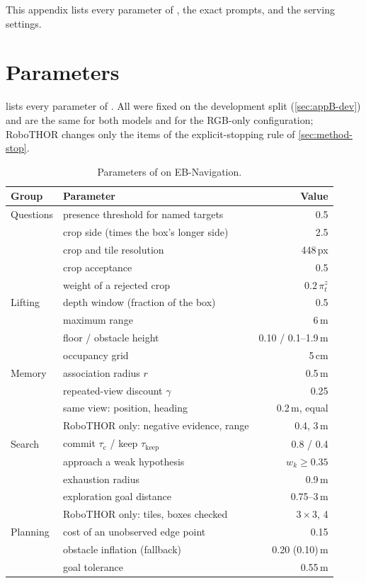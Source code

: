 \label{app:impl}
This appendix lists every parameter of \ours, the exact prompts, and the serving settings.

\section{Parameters}
\label{sec:appA-params}
 lists every parameter of \ours. All were fixed on the development split (\cref{sec:appB-dev})
and are the same for both models and for the RGB-only configuration; RoboTHOR changes only the items of the
explicit-stopping rule of \cref{sec:method-stop}.

\begin{table}[htbp]
\centering\small
\caption{Parameters of \ours on EB-Navigation.}
\label{tab:s-params}
\footnotesize\setlength{\tabcolsep}{3pt}
\begin{tabular*}{\linewidth}{@{\extracolsep{\fill}}llr@{}}
\toprule
Group & Parameter & Value\\
\midrule
Questions & presence threshold for named targets & 0.5\\
 & crop side (times the box's longer side) & 2.5\\
 & crop and tile resolution & 448\,px\\
 & crop acceptance & 0.5\\
 & weight of a rejected crop & $0.2\,\pi^z_t$\\
Lifting & depth window (fraction of the box) & 0.5\\
 & maximum range & 6\,m\\
 & floor / obstacle height & 0.10 / 0.1--1.9\,m\\
 & occupancy grid & 5\,cm\\
Memory & association radius $r$ & 0.5\,m\\
 & repeated-view discount $\gamma$ & 0.25\\
 & same view: position, heading & 0.2\,m, equal\\
 & RoboTHOR only: negative evidence, range & 0.4, 3\,m\\
Search & commit $\tau_\mathrm{c}$ / keep $\tau_\mathrm{keep}$ & 0.8 / 0.4\\
 & approach a weak hypothesis & $w_k\ge0.35$\\
 & exhaustion radius & 0.9\,m\\
 & exploration goal distance & 0.75--3\,m\\
 & RoboTHOR only: tiles, boxes checked & $3{\times}3$, 4\\
Planning & cost of an unobserved edge point & 0.15\\
 & obstacle inflation (fallback) & 0.20 (0.10)\,m\\
 & goal tolerance & 0.55\,m\\
\bottomrule
\end{tabular*}
\end{table}

